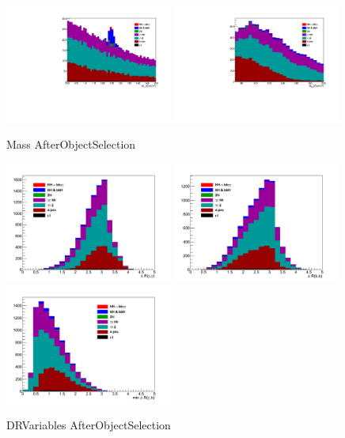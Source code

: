 \documentclass{cmspaper}
\begin{document}
 \begin{figure}[h]
   \centering
  \includegraphics[width=0.49\textwidth]{figures/MassGG.pdf}
  \includegraphics[width=0.49\textwidth]{figures/MassBB.pdf}
   \caption{Mass AfterObjectSelection}
   \label{fig:HiggsMass_AfterObjectSelection}
 \end{figure}
  
\begin{figure}[h]
  \centering
  \includegraphics[width=0.49\textwidth]{figures/dRgg.pdf}
  \includegraphics[width=0.49\textwidth]{figures/dRbb.pdf}
  \includegraphics[width=0.49\textwidth]{figures/minDRgb.pdf}
  \caption{DRVariables AfterObjectSelection}
  \label{fig:DRVariables_AfterObjectSelection}
\end{figure}
\end{document}
